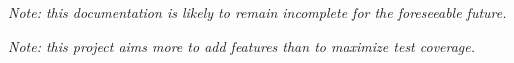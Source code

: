 \noindent
{\em \small Note: this documentation is likely to remain incomplete
for the foreseeable future.}

\noindent
{\em \small Note: this project aims more to add features than to maximize
test coverage.}

